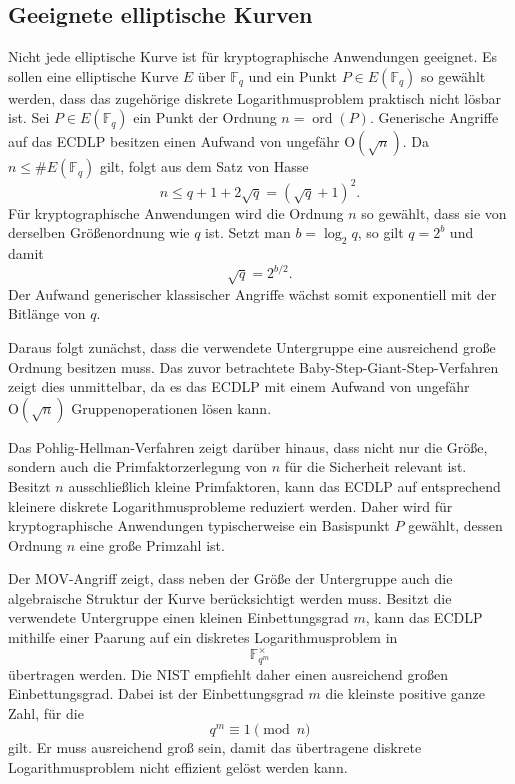 \subsection{Geeignete elliptische Kurven}
Nicht jede elliptische Kurve ist für kryptographische Anwendungen geeignet. Es sollen eine elliptische Kurve $E$ über $\mathbb{F}_q$ und ein Punkt $P\in E(\mathbb{F}_q)$ so gewählt werden, dass das zugehörige diskrete Logarithmusproblem praktisch nicht lösbar ist. Sei $P\in E(\mathbb{F}_q)$ ein Punkt der Ordnung $n= \operatorname{ord}(P)$. Generische Angriffe auf das ECDLP besitzen einen Aufwand von ungefähr $\mathrm{O}(\sqrt{n})$. Da $n\leq \#E(\mathbb{F}_q)$ gilt, folgt aus dem Satz von Hasse
\[
    n\leq q+1+2\sqrt{q}={(\sqrt{q}+1)}^2.
\]
Für kryptographische Anwendungen wird die Ordnung $n$ so gewählt, dass sie von derselben Größenordnung wie $q$ ist. Setzt man $b=\log_2 q$, so gilt $q=2^b$ und damit
\[
    \sqrt{q}=2^{b/2}.
\]
Der Aufwand generischer klassischer Angriffe wächst somit exponentiell mit der Bitlänge von $q$.

Daraus folgt zunächst, dass die verwendete Untergruppe eine ausreichend große Ordnung besitzen muss. Das zuvor betrachtete Baby-Step-Giant-Step-Verfahren zeigt dies unmittelbar, da es das ECDLP mit einem Aufwand von ungefähr $\mathrm{O}(\sqrt{n})$ Gruppenoperationen lösen kann.

Das Pohlig-Hellman-Verfahren zeigt darüber hinaus, dass nicht nur die Größe, sondern auch die Primfaktorzerlegung von $n$ für die Sicherheit relevant ist. Besitzt $n$ ausschließlich kleine Primfaktoren, kann das ECDLP auf entsprechend kleinere diskrete Logarithmusprobleme reduziert werden. Daher wird für kryptographische Anwendungen typischerweise ein Basispunkt $P$ gewählt, dessen Ordnung $n$ eine große Primzahl ist.

Der MOV-Angriff zeigt, dass neben der Größe der Untergruppe auch die algebraische Struktur der Kurve berücksichtigt werden muss. Besitzt die verwendete Untergruppe einen kleinen Einbettungsgrad $m$, kann das ECDLP mithilfe einer Paarung auf ein diskretes Logarithmusproblem in
\[
    \mathbb F_{q^m}^{\times}
\]
übertragen werden. Die NIST empfiehlt daher einen ausreichend großen Einbettungsgrad. Dabei ist der Einbettungsgrad $m$ die kleinste positive
ganze Zahl, für die
\[
    q^m\equiv 1\pmod n
\]
gilt. Er muss ausreichend groß sein, damit das übertragene
diskrete Logarithmusproblem nicht effizient gelöst werden kann.


